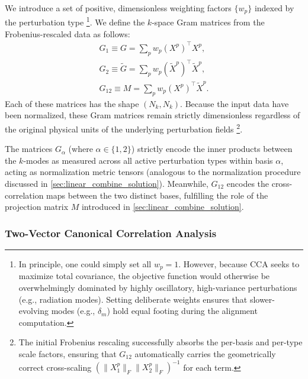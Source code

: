 \begin{subappendices}
We introduce a set of positive, dimensionless weighting factors $\{w_p\}$ indexed by the perturbation type \footnote{In principle, one could simply set all $w_p=1$. However, because CCA seeks to maximize total covariance, the objective function would otherwise be overwhelmingly dominated by highly oscillatory, high-variance perturbations (e.g., radiation modes). Setting deliberate weights ensures that slower-evolving modes (e.g., $\delta_m$) hold equal footing during the alignment computation.}. We define the $k$-space Gram matrices from the Frobenius-rescaled data as follows:
\begin{equation}
\begin{aligned}
    G_1\equiv G = \sum_p w_p ({X}^p)^\top {X}^p,\\
    G_2\equiv\tilde G = \sum_p w_p (\tilde{X}^p)^\top \tilde{X}^p,\\
    G_{12}\equiv M = \sum_p w_p (X^p)^\top \tilde{X}^p.
\end{aligned}
\end{equation}
Each of these matrices has the shape $(N_k, N_k)$. Because the input data have been normalized, these Gram matrices remain strictly dimensionless regardless of the original physical units of the underlying perturbation fields \footnote{The initial Frobenius rescaling successfully absorbs the per-basis and per-type scale factors, ensuring that $G_{12}$ automatically carries the geometrically correct cross-scaling $(\|X_1^p\|_F \|X_2^p\|_F)^{-1}$ for each term.}.

The matrices $G_\alpha$ (where $\alpha \in \{1,2\}$) strictly encode the inner products between the $k$-modes as measured across all active perturbation types within basis $\alpha$, acting as normalization metric tensors (analogous to the normalization procedure discussed in \cref{sec:linear_combine_solution}). Meanwhile, $G_{12}$ encodes the cross-correlation maps between the two distinct bases, fulfilling the role of the projection matrix $M$ introduced in \cref{sec:linear_combine_solution}.

\subsubsection{Two-Vector Canonical Correlation Analysis}


\end{subappendices}
